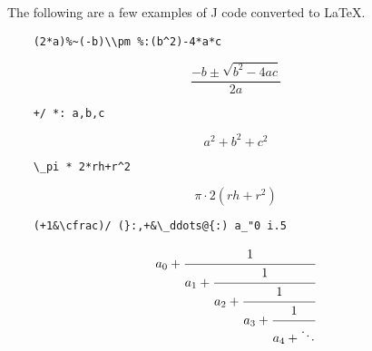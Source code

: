 \documentclass{article}
\begin{document}
The following are a few examples of J code converted to LaTeX.
\begin{lstlisting}
    (2*a)%~(-b)\\pm %:(b^2)-4*a*c
\end{lstlisting}
\[\frac{-b \pm \sqrt{b^2-4 a c}}{2 a}\]
\begin{lstlisting}
    +/ *: a,b,c
\end{lstlisting}
\[a^2+b^2+c^2\]
\begin{lstlisting}
    \_pi * 2*rh+r^2
\end{lstlisting}
\[\pi\cdot 2 \left(rh+r^2\right)\]
\begin{lstlisting}
    (+1&\cfrac)/ (}:,+&\_ddots@{:) a_"0 i.5
\end{lstlisting}
\[a_0+\cfrac{1}{a_1+\cfrac{1}{a_2+\cfrac{1}{a_3+\cfrac{1}{a_4+\ddots}}}}\]
\end{document}
